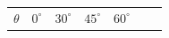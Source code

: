 {{        \begin{center}
      
      \label{m39414*id84073}
      
    \noindent
      \tablelasttail{}
      \begin{xtabular}[t]{|l|l|l|l|l|l|l|}\hline
    
    
        
                  \begin{math}\theta \end{math}
                 &
    
    
        
                  \begin{math}{0}^{\circ }\end{math}
                 &
    
    
        
                  \begin{math}{30}^{\circ }\end{math}
                 &
    
    
        
                  \begin{math}{45}^{\circ }\end{math}
                 &
    
    
        
                  \begin{math}{60}^{\circ }\end{math}
                 &
    

\end{xtabular}
\end{center}}}
